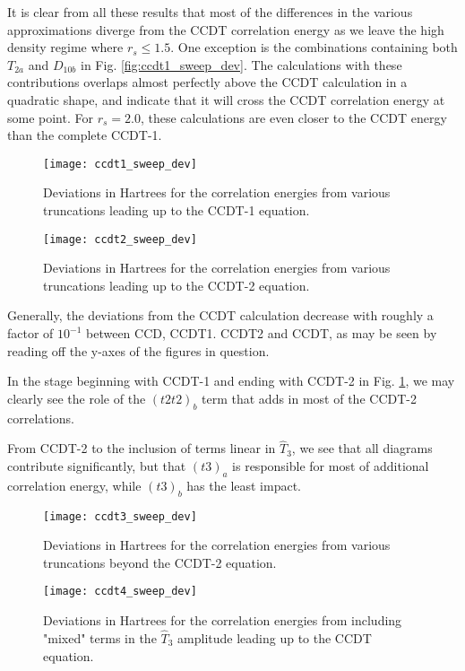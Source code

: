 It is clear from all these results that most of the differences in the
various approximations diverge from the CCDT correlation energy as we
leave the high density regime where $r_s \leq 1.5$. One exception is
the combinations containing both $T_{2a}$ and $D_{10b}$ in
Fig. \ref{fig:ccdt1_sweep_dev}. The calculations with these
contributions overlaps almost perfectly above the CCDT
calculation in a quadratic shape, and indicate that it will cross the
CCDT correlation energy at some point. For $r_s = 2.0$, these
calculations are even closer to the CCDT energy than the complete
CCDT-1.

\begin{figure}[!htb]
  \centering
  \texttt{[image: ccdt1\_sweep\_dev]}
  \caption{Deviations in Hartrees for the correlation energies from various truncations leading up to the CCDT-1 equation.}\label{fig:ccdt1_sweep_dev}
\endminipage\hfill
{}
  \centering
  \texttt{[image: ccdt2\_sweep\_dev]}
  \caption{Deviations in Hartrees for the correlation energies from various truncations leading up to the CCDT-2 equation.}\label{fig:ccdt2_sweep_dev}
\endminipage\hfill
{}
\endminipage\hfill
\end{figure}

Generally, the deviations from the CCDT calculation decrease with
roughly a factor of $10^{-1}$ between CCD, CCDT1. CCDT2 and CCDT, as
may be seen by reading off the y-axes of the figures in question.

In the stage beginning with CCDT-1 and ending with CCDT-2 in
Fig. \ref{fig:ccdt2_sweep_dev}, we may clearly see the role of  the $(t2t2)_b$
term that adds in most of the CCDT-2 correlations.

From CCDT-2 to the inclusion of terms linear in $\hat{T}_3$, we see
that all diagrams contribute significantly, but that $(t3)_a$ is
responsible for most of additional correlation energy, while $(t3)_b$ has the least
impact.

\begin{figure}[!htb]
  \centering
  \texttt{[image: ccdt3\_sweep\_dev]}
  \caption{Deviations in Hartrees for the correlation energies from various truncations beyond the CCDT-2 equation.}\label{fig:ccdt3_sweep_dev}
\endminipage\hfill
{}
  \centering
  \texttt{[image: ccdt4\_sweep\_dev]}
  \caption{Deviations in Hartrees for the correlation energies from including "mixed" terms in the $\hat{T}_3$ amplitude leading up to the CCDT equation.}
\label{fig:ccdt4_sweep}
\endminipage\hfill
\end{figure}


